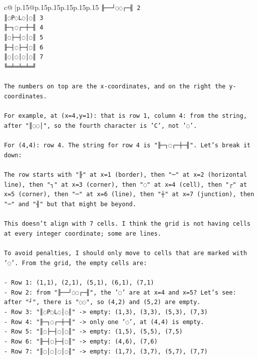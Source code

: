 \documentclass{article}
\begin{document}
{\begin{supertabular}{c@{$\;$}|p{.15\linewidth}@{}p{.15\linewidth}p{.15\linewidth}p{.15\linewidth}p{.15\linewidth}p{.15\linewidth}}
{{{\texttt{╟──┘◌◌┌─╢ 2} \\
\texttt{║◌P◌L◌│◌║ 3} \\
\texttt{╟─┐◌┌─┼─╢ 4} \\
\texttt{║◌├─┤◌│◌║ 5} \\
\texttt{╟─┤◌├─┤◌║ 6} \\
\texttt{║◌│◌│◌│◌║ 7} \\
\texttt{╚═╧═╧═╧═╝} \\
\\ 
\texttt{The numbers on top are the x{-}coordinates, and on the right the y{-}coordinates.} \\
\\ 
\texttt{For example, at (x=4,y=1): that is row 1, column 4: from the string, after "║◌◌│", so the fourth character is 'C', not '◌'.} \\
\\ 
\texttt{For (4,4): row 4. The string for row 4 is "╟─┐◌┌─┼─╢". Let's break it down:} \\
\\ 
\texttt{The row starts with "╟" at x=1 (border), then "─" at x=2 (horizontal line), then "┐" at x=3 (corner), then "◌" at x=4 (cell), then "┌" at x=5 (corner), then "─" at x=6 (line), then "┼" at x=7 (junction), then "─" and "╢" but that might be beyond.} \\
\\ 
\texttt{This doesn't align with 7 cells. I think the grid is not having cells at every integer coordinate; some are lines.} \\
\\ 
\texttt{To avoid penalties, I should only move to cells that are marked with '◌'. From the grid, the empty cells are:} \\
\\ 
\texttt{{-} Row 1: (1,1), (2,1), (5,1), (6,1), (7,1)} \\
\texttt{{-} Row 2: from "╟──┘◌◌┌─╢", the '◌' are at x=4 and x=5? Let's see: after "┘", there is "◌◌", so (4,2) and (5,2) are empty.} \\
\texttt{{-} Row 3: "║◌P◌L◌│◌║" {-}> empty: (1,3), (3,3), (5,3), (7,3)} \\
\texttt{{-} Row 4: "╟─┐◌┌─┼─╢" {-}> only one '◌', at (4,4) is empty.} \\
\texttt{{-} Row 5: "║◌├─┤◌│◌║" {-}> empty: (1,5), (5,5), (7,5)} \\
\texttt{{-} Row 6: "╟─┤◌├─┤◌║" {-}> empty: (4,6), (7,6)} \\
\texttt{{-} Row 7: "║◌│◌│◌│◌║" {-}> empty: (1,7), (3,7), (5,7), (7,7)} \\
}}}
\end{supertabular}}
\end{document}
